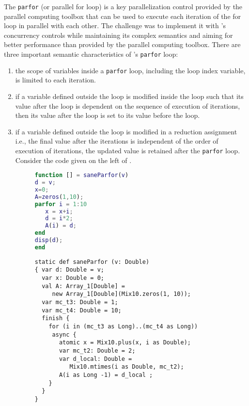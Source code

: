 The  \verb|parfor| (or parallel
for loop) is a key parallelization control provided by the
\matlab parallel computing toolbox that can be used to execute each
iteration of the for loop in parallel with each other. The challenge was
to implement it with \xten's concurrency controls while maintaining its
complex semantics and aiming for better performance than provided by the
parallel computing toolbox. 
There are three important semantic characteristics of \matlab's
\verb|parfor| loop: 
\begin{enumerate}
\item the scope of variables inside a \verb|parfor|
loop, including the loop index variable, is limited to each iteration.

\item if a variable defined outside the loop is modified inside the loop
such that its value after the loop is dependent on the sequence of
execution of iterations, then its value after the loop is set to its
value before the loop. 

\item if a variable defined outside the loop is
modified in a reduction assignment i.e., the final value after the
iterations is independent of the order of execution of iterations, the
updated value is retained after the \verb|parfor| loop. Consider the
\matlab code given on the left of .

\begin{figure}[htbp]
\begin{minipage}{0.4\linewidth}
\begin{lstlisting}[language=Matlab,numbers=none]                                
function [] = saneParfor(v)
d = v; 
x=0;
A=zeros(1,10);
parfor i = 1:10
   x = x+i;
   d = i*2;
   A(i) = d;
end
disp(d);
end
\end{lstlisting}  
\end{minipage}\hfill
\begin{minipage}{0.6\linewidth}
\begin{lstlisting}[language=X10,numbers=none]                                   
static def saneParfor (v: Double)
{ var d: Double = v;
  var x: Double = 0;
  val A: Array_1[Double] = 
     new Array_1[Double](Mix10.zeros(1, 10));
  var mc_t3: Double = 1;
  var mc_t4: Double = 10;
  finish {
    for (i in (mc_t3 as Long)..(mc_t4 as Long))
     async {
       atomic x = Mix10.plus(x, i as Double);
       var mc_t2: Double = 2;
       var d_local: Double = 
          Mix10.mtimes(i as Double, mc_t2);
       A(i as Long -1) = d_local ;
    }
  }
}
\end{lstlisting}              
\end{minipage}


\end{figure}
\end{enumerate}
